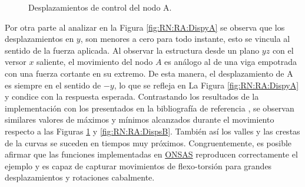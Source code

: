 \begingroup
\centering
\begin{figure}[htbp]
	\centering
	\caption{Desplazamientos de control del nodo A.} \label{fig:RN:RA:DispsA}
\end{figure}
\endgroup

Por otra parte al analizar en la Figura \ref{fig:RN:RA:DispyA} se observa que los desplazamientos en $y$, son menores a cero para todo instante, esto se vincula al sentido de la fuerza aplicada. Al observar la estructura desde un plano $yz$ con el versor $x$ saliente, el movimiento del nodo $A$ es análogo al de una viga empotrada con una fuerza cortante en su extremo. De esta manera, el desplazamiento de A es siempre en el sentido de $-y$, lo que se refleja en La Figura \ref{fig:RN:RA:DispyA} y condice con la respuesta esperada. Contrastando los resultados de la implementación con los presentados en la bibliografía de referencia \textcite{Le2014}, se observan similares valores de máximos y mínimos alcanzados durante el movimiento respecto a las Figuras \ref{fig:RN:RA:DispsA} y \ref{fig:RN:RA:DispsB}. También así los valles y las crestas de la curvas se suceden en tiempos muy próximos. Congruentemente, es posible afirmar que las funciones implementadas en \href{https://github.com/ONSAS/ONSAS/}{ONSAS} reproducen correctamente el ejemplo y es capaz de capturar movimientos de flexo-torsión para grandes desplazamientos y rotaciones cabalmente. 


